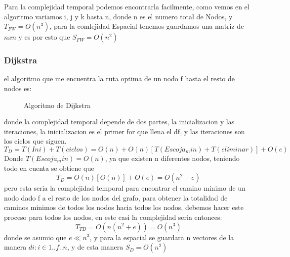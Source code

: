 \documentclass{article}
\begin{document}
 Para la complejidad temporal podemos encontrarla facilmente, como vemos en el algoritmo variamos i, j y k hasta n, donde n es el numero total de Nodos, y $T_{FW}=O(n^3)$, para la comlejidad Espacial tenemos guardamos una matriz de $nxn$ y es por esto que $S_{FW}=O(n^2)$

\subsubsection*{Dijkstra}
el algoritmo que me encuentra la ruta optima de un nodo f hasta el resto de nodos es: 

\begin{figure}[H]
\begin{center}
 \caption{Algoritmo de Dijkstra}
 \label{dijkstra}
 \end{center}
\end{figure}

donde la complejidad temporal depende de dos partes, la inicializacion y las iteraciones, la inicializacion es el primer for que llena el df, y las iteraciones son los ciclos que siguen.
\begin{equation}
T_D=T(Ini)+T(ciclos)=O(n)+O(n)[T(Escoja_min)+T(eliminar)]+O(e)
\end{equation}
Donde $T(Escoja_min)=O(n)$, ya que existen n diferentes nodos, teniendo todo en cuenta se obtiene que
\begin{equation}
T_D=O(n)[O(n)]+O(e)=O(n^2+e)
\end{equation}
pero esta seria la complejidad temporal para encontrar el camino minimo de un nodo dado f a el resto de los nodos del grafo, para obtener la totalidad de caminos minimos de todos los nodos hacia todos los nodos, debemos hacer este proceso para todos los nodos, en este casi la complejidad seria entonces:
\begin{equation}
T_{TD}=O(n(n^2+e))=O(n^3)
\end{equation}
donde se asumio que $e\ll n^3$, y para la espacial se guardara n vectores de la manera $di:i\in{1..f..n}$, y de esta manera $S_D=O(n^2)$
\end{document}
